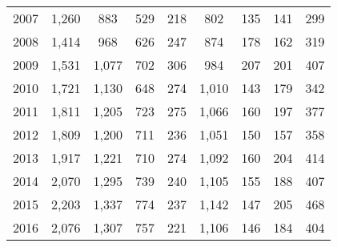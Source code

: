 \begin{table}[htbp]
\begin{tabular}{l*{8}{c}}
2007      &    1,260&      883&      529&      218&      802&      135&      141&      299\\
2008      &    1,414&      968&      626&      247&      874&      178&      162&      319\\
2009      &    1,531&    1,077&      702&      306&      984&      207&      201&      407\\
2010      &    1,721&    1,130&      648&      274&    1,010&      143&      179&      342\\
2011      &    1,811&    1,205&      723&      275&    1,066&      160&      197&      377\\
2012      &    1,809&    1,200&      711&      236&    1,051&      150&      157&      358\\
2013      &    1,917&    1,221&      710&      274&    1,092&      160&      204&      414\\
2014      &    2,070&    1,295&      739&      240&    1,105&      155&      188&      407\\
2015      &    2,203&    1,337&      774&      237&    1,142&      147&      205&      468\\
2016      &    2,076&    1,307&      757&      221&    1,106&      146&      184&      404\\
\hline\hline
\end{tabular}
\end{table}
